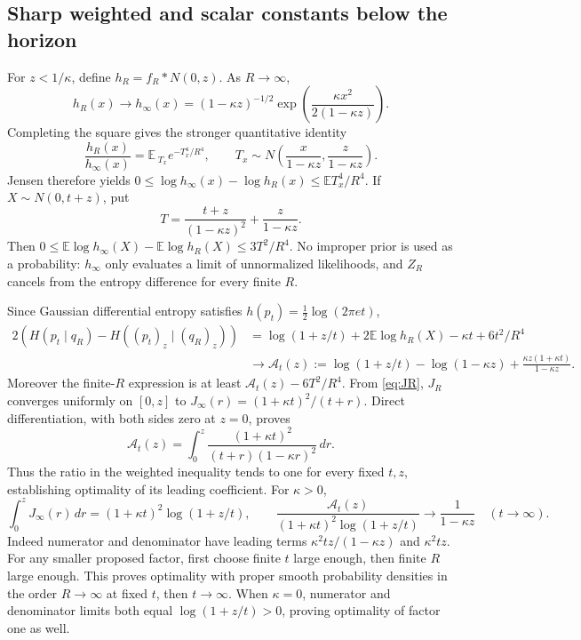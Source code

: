\documentclass[11pt]{article}
\theoremstyle{remark}\newtheorem{remark}[theorem]{Remark}
\newcommand{\E}{\mathbb E}
\begin{document}
\subsection{Sharp weighted and scalar constants below the horizon}
For $z<1/\kappa$, define $h_R=f_R*N(0,z)$.
As $R\to\infty$,
\[
h_R(x)\longrightarrow h_\infty(x)
=(1-\kappa z)^{-1/2}
\exp\!\left(\frac{\kappa x^2}{2(1-\kappa z)}\right).
\]
Completing the square gives the stronger quantitative identity
\[
\frac{h_R(x)}{h_\infty(x)}
=\E_{\;T_x}e^{-T_x^4/R^4},\qquad
T_x\sim N\left(\frac{x}{1-\kappa z},\frac z{1-\kappa z}\right).
\]
Jensen therefore yields
$0\le\log h_\infty(x)-\log h_R(x)\le\E T_x^4/R^4$.
If $X\sim N(0,t+z)$, put
\[
T=\frac{t+z}{(1-\kappa z)^2}+\frac z{1-\kappa z}.
\]
Then $0\le\E\log h_\infty(X)-\E\log h_R(X)\le3T^2/R^4$.
No improper prior is used as a probability: $h_\infty$ only evaluates a
limit of unnormalized likelihoods, and $Z_R$ cancels from the entropy
difference for every finite $R$.

Since Gaussian differential entropy satisfies $h(p_t)=\frac12\log(2\pi et)$,
\begin{align*}
2(H(p_t\mid q_R)-H((p_t)_z\mid(q_R)_z))
&=\log(1+z/t)+2\E\log h_R(X)-\kappa t+6t^2/R^4\\
&\longrightarrow
\mathcal A_t(z)
:=\log(1+z/t)-\log(1-\kappa z)
+\frac{\kappa z(1+\kappa t)}{1-\kappa z}.
\end{align*}
Moreover the finite-$R$ expression is at least
$\mathcal A_t(z)-6T^2/R^4$.
From \eqref{eq:JR}, $J_R$ converges uniformly on $[0,z]$ to
$J_\infty(r)=(1+\kappa t)^2/(t+r)$.
Direct differentiation, with both sides zero at $z=0$, proves
\[
\mathcal A_t(z)=\int_0^z
\frac{(1+\kappa t)^2}{(t+r)(1-\kappa r)^2}\,dr.
\]
Thus the ratio in the weighted inequality tends to one for every fixed
$t,z$, establishing optimality of its leading coefficient.
For $\kappa>0$,
\[
\int_0^zJ_\infty(r)\,dr=(1+\kappa t)^2\log(1+z/t),\qquad
\frac{\mathcal A_t(z)}{(1+\kappa t)^2\log(1+z/t)}
\longrightarrow\frac1{1-\kappa z}\quad(t\to\infty).
\]
Indeed numerator and denominator have leading terms
$\kappa^2tz/(1-\kappa z)$ and $\kappa^2tz$.
For any smaller proposed factor, first choose finite $t$ large enough,
then finite $R$ large enough. This proves optimality with proper smooth
probability densities in the order $R\to\infty$ at fixed $t$, then $t\to\infty$.
When $\kappa=0$, numerator and denominator limits both equal
$\log(1+z/t)>0$, proving optimality of factor one as well.
\end{document}
